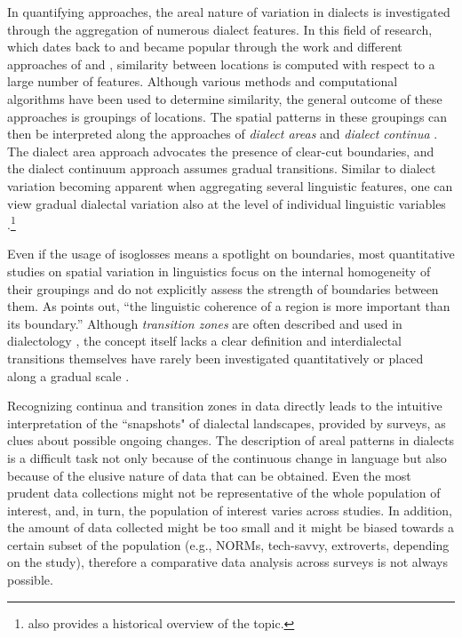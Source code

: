 \documentclass[output=paper]{langscibook}
\begin{document}
In quantifying approaches, the areal nature of variation in dialects is investigated through the aggregation of numerous dialect features. In this field of research, which dates back to \textcite{Seguy1971} and became popular through the work and different approaches of \textcite[e.g.,][]{Goebl1982} and \textcite[e.g.,][]{Nerbonne2009DataDriven}, similarity  between locations is computed with respect to a large number of features. Although various methods and computational algorithms have been used to determine similarity, the general outcome of these approaches is groupings of locations. The spatial patterns in these groupings can then be interpreted along the approaches of \textit{dialect areas} and \textit{dialect continua} \parencite[cf.][]{Heeringa2001}. The dialect area approach advocates the presence of clear-cut boundaries, and the dialect continuum approach assumes gradual transitions. Similar to dialect variation becoming apparent when aggregating several linguistic features, one can view gradual dialectal variation also at the level of individual linguistic variables
\parencite[cf.][]{Pickl2013b}.\footnote{\citet{Pickl2013b} also provides a historical overview of the topic.} 

Even if the usage of isoglosses means a spotlight on boundaries, most quantitative studies on spatial variation in linguistics focus on the internal homogeneity of their groupings and do not explicitly assess the strength of boundaries between them. As \textcite[][664]{Haas2010} points out, “the linguistic coherence of a region is more important than its boundary.” Although \textit{transition zones} are often described and used in dialectology 
\parencite[e.g.][]{Pickl2013,Scholz2016},
the concept itself lacks a clear definition and interdialectal transitions themselves have rarely been investigated quantitatively or placed along a gradual scale \parencite{JeszenszkyPaper2}.

Recognizing continua and transition zones in data directly leads to the intuitive interpretation of the ``snapshots" of dialectal landscapes, provided by surveys, as clues about possible ongoing changes. 
The description of areal patterns in dialects is a difficult task not only because of the continuous change in language but also because of the elusive nature of data that can be obtained. Even the most prudent data collections might not be representative of the whole population of interest, and, in turn, the population of interest varies across studies. In addition, the amount of data collected might be too small and it might be biased towards a certain subset of the population (e.g., NORMs, tech-savvy, extroverts, depending on the study), therefore a comparative data analysis across surveys is not always possible. 
\end{document}
